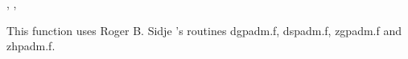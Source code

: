 \begin{manseealso}
  , ,   
\end{manseealso}

\begin{authors}
  This function uses Roger B. Sidje 's routines dgpadm.f, dspadm.f, zgpadm.f and zhpadm.f.
\end{authors}
